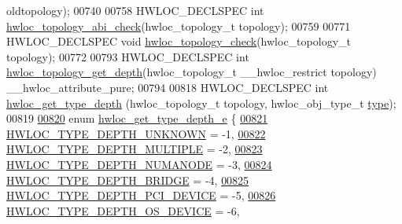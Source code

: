 \begin{DoxyCode}
      oldtopology);
00740 
00758 HWLOC\_DECLSPEC \textcolor{keywordtype}{int} \hyperlink{a00186_ga0647ae66458fe68172eb5a320042f870}{hwloc\_topology\_abi\_check}(hwloc\_topology\_t topology);
00759 
00771 HWLOC\_DECLSPEC \textcolor{keywordtype}{void} \hyperlink{a00186_gaf6746bc3a558ef1ac8348b4491d091b5}{hwloc\_topology\_check}(hwloc\_topology\_t topology);
00772 
00793 HWLOC\_DECLSPEC \textcolor{keywordtype}{int} \hyperlink{a00187_gae54d1782ca9b54bea915f5c18a9158fa}{hwloc\_topology\_get\_depth}(hwloc\_topology\_t \_\_hwloc\_restrict 
      topology) \_\_hwloc\_attribute\_pure;
00794 
00818 HWLOC\_DECLSPEC \textcolor{keywordtype}{int} \hyperlink{a00187_ga8bec782e21be313750da70cf7428b374}{hwloc\_get\_type\_depth} (hwloc\_topology\_t topology, hwloc\_obj\_type\_t 
      \hyperlink{a00238_acc4f0803f244867e68fe0036800be5de}{type});
00819 
\hyperlink{a00187_gaf4e663cf42bbe20756b849c6293ef575}{00820} \textcolor{keyword}{enum} \hyperlink{a00187_gaf4e663cf42bbe20756b849c6293ef575}{hwloc\_get\_type\_depth\_e} \{
\hyperlink{a00187_ggaf4e663cf42bbe20756b849c6293ef575a0565ab92ab72cb0cec91e23003294aad}{00821}     \hyperlink{a00187_ggaf4e663cf42bbe20756b849c6293ef575a0565ab92ab72cb0cec91e23003294aad}{HWLOC\_TYPE\_DEPTH\_UNKNOWN} = -1,    
\hyperlink{a00187_ggaf4e663cf42bbe20756b849c6293ef575ae99465995cacde6c210d5fc2e409798c}{00822}     \hyperlink{a00187_ggaf4e663cf42bbe20756b849c6293ef575ae99465995cacde6c210d5fc2e409798c}{HWLOC\_TYPE\_DEPTH\_MULTIPLE} = -2,   
\hyperlink{a00187_ggaf4e663cf42bbe20756b849c6293ef575a245c34ec9884c2cf5de5049b2153ed9c}{00823}     \hyperlink{a00187_ggaf4e663cf42bbe20756b849c6293ef575a245c34ec9884c2cf5de5049b2153ed9c}{HWLOC\_TYPE\_DEPTH\_NUMANODE} = -3,   
\hyperlink{a00187_ggaf4e663cf42bbe20756b849c6293ef575af93b50182973e4a718d9d4db9e253a90}{00824}     \hyperlink{a00187_ggaf4e663cf42bbe20756b849c6293ef575af93b50182973e4a718d9d4db9e253a90}{HWLOC\_TYPE\_DEPTH\_BRIDGE} = -4,     
\hyperlink{a00187_ggaf4e663cf42bbe20756b849c6293ef575ad8b1516e699b57ce1c8d107fbd2f674c}{00825}     \hyperlink{a00187_ggaf4e663cf42bbe20756b849c6293ef575ad8b1516e699b57ce1c8d107fbd2f674c}{HWLOC\_TYPE\_DEPTH\_PCI\_DEVICE} = -5, 
\hyperlink{a00187_ggaf4e663cf42bbe20756b849c6293ef575afe9a2131073eebbe129d4aa2928d3f46}{00826}     \hyperlink{a00187_ggaf4e663cf42bbe20756b849c6293ef575afe9a2131073eebbe129d4aa2928d3f46}{HWLOC\_TYPE\_DEPTH\_OS\_DEVICE} = -6,  

\end{DoxyCode}
